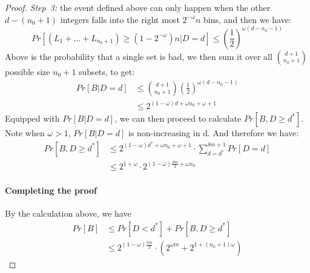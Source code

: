 \begin{proof}
  \textit{Step~3:} the event defined above can only happen when the other $d - (n_0 + 1)$ integers falls into the right most $2^{-\omega}n$ bins, and then
  we have:
  \begin{equation}
    Pr[(L_1 + \dots + L_{n_0+1}) \geq (1-2^{-\omega})n|D = d] \leq (\frac{1}{2})^{\omega(d-n_0-1)}
  \end{equation}
  Above is the probability that a single set is bad, we then sum it over all $\binom{d+1}{n_0+1}$ possible size $n_0 + 1$ subsets, to get:
  \begin{align}
    Pr[B|D = d] &\leq \binom{d+1}{n_0+1}(\frac{1}{2})^{\omega(d-n_0-1)} \\
    &\leq 2^{(1-\omega)d + \omega n_0 + \omega + 1}
  \end{align}
  Equipped with $Pr[B|D = d]$, we can then proceed to calculate $Pr[B, D \geq d^*]$. Note when $\omega > 1$, $Pr[B|D = d]$ is non-increasing
  in d. And therefore we have:
  \begin{align}
    Pr[B, D \geq d^*] &\leq 2^{(1-\omega)d^* + \omega n_0 + \omega + 1} \cdot \sum_{d = d^*}^{\delta m + 1}{Pr[D = d]} \\
    &\leq 2^{1+\omega} \cdot 2^{(1-\omega)\frac{\delta m}{2} + \omega n_0}
  \end{align}

  \paragraph{Completing the proof}
  By the calculation above, we have
  \begin{align}
    Pr[B] &\leq Pr[D < d^*] + Pr[B, D \geq d^*] \\
    &\leq 2^{(1-\omega)\frac{\delta m}{2}} \cdot (2^{\omega m} + 2^{1+(n_0+1)\omega})
  \end{align}
\end{proof}

